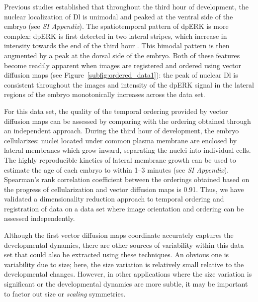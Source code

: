 \documentclass{pnastwo}
\begin{document}
\begin{article}

Previous studies \cite{rushlow2012temporal} established that throughout the third hour of development, the nuclear localization of Dl is unimodal and peaked at the ventral side of the embryo (see {\it SI Appendix}).
%
The spatiotemporal pattern of dpERK is more complex: dpERK is first detected in two lateral stripes, which increase in intensity towards the end of the third hour \cite{lim2013kinetics}.
%
This bimodal pattern is then augmented by a peak at the dorsal side of the embryo.
%
Both of these features become readily apparent when images are registered and ordered using vector diffusion maps (see Figure~\ref{subfig:ordered_data1}): the peak of nuclear Dl is consistent throughout the images and intensity of the dpERK signal in the lateral regions of the embryo monotonically increases across the data set.
%

For this data set, the quality of the temporal ordering provided by vector diffusion maps can be assessed by comparing with the ordering obtained through an independent approach.
%
During the third hour of development, the embryo cellularizes: nuclei located under common plasma membrane are enclosed by lateral membranes which grow inward, separating the nuclei into individual cells.
%
The highly reproducible kinetics of lateral membrane growth can be used to estimate the age of each embryo to within 1--3 minutes \cite{figard2013plasma} (see {\it SI Appendix}).
%
Spearman's rank correlation coefficient between the orderings obtained based on the progress of cellularization and vector diffusion maps is 0.91.
%
Thus, we have validated a dimensionality reduction approach to temporal ordering and registration of data on a data set where image orientation and ordering can be assessed independently.

Although the first vector diffusion maps coordinate accurately captures the developmental dynamics, there are other sources of variability within this data set that could also be extracted using these techniques.
%
An obvious one is variability due to size; here, the size variation is relatively small relative to the developmental changes.
%
However, in other applications where the size variation is significant or the developmental dynamics are more subtle, it may be important to factor out size or {\it scaling} symmetries.



\end{article}
\end{document}
